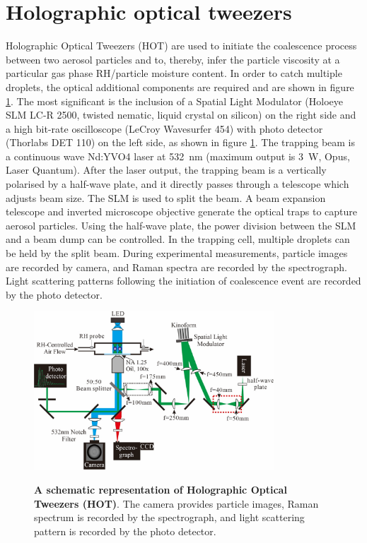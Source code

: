 \section{Holographic optical tweezers}
Holographic Optical Tweezers (HOT) are used to initiate the coalescence process between two aerosol particles and to, thereby, infer the particle viscosity at a particular gas phase RH/particle moisture content.\cite{Song2016a} In order to catch multiple droplets, the optical additional components are required and are shown in figure \ref{fig:wat_s5}. The most significant is the inclusion of a Spatial Light Modulator (Holoeye SLM LC-R 2500, twisted nematic, liquid crystal on silicon) on the right side and a high bit-rate oscilloscope (LeCroy Wavesurfer 454) with photo detector (Thorlabs DET 110) on the left side, as shown in figure \ref{fig:wat_s5}. The trapping beam is a continuous wave Nd:YVO4 laser at \SI{532}{\nano\meter} (maximum output is \SI{3}{\watt}, Opus, Laser Quantum). After the laser output, the trapping beam is a vertically polarised by a half-wave plate, and it directly passes through a telescope which adjusts beam size. The SLM is used to split the beam. A beam expansion telescope and inverted microscope objective generate the optical traps to capture aerosol particles. Using the half-wave plate, the power division between the SLM and a beam dump can be controlled. In the trapping cell, multiple droplets can be held by the split beam. During experimental measurements, particle images are recorded by camera, and Raman spectra are recorded by the spectrograph. Light scattering patterns following the initiation of coalescence event are recorded by the photo detector.

\begin{figure}
    \centering
    \caption{\textbf{A schematic representation of Holographic Optical Tweezers (HOT)}. The camera provides particle images, Raman spectrum is recorded by the spectrograph, and light scattering pattern is recorded by the photo detector.\cite{Song2016a}}
    \includegraphics[width=0.8\textwidth]{chapters/water_hopping/figures/image011.jpg}
    \label{fig:wat_s5}
\end{figure}

